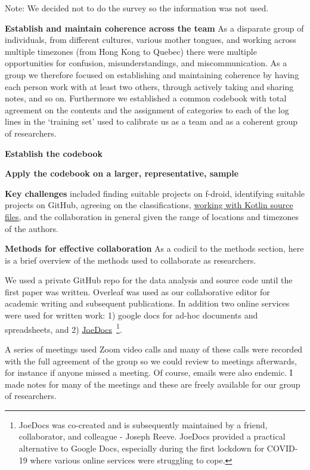Note: We decided not to do the survey so the information was not used.


\textbf{Establish and maintain coherence across the team}
As a disparate group of individuals, from different cultures, various mother tongues, and working across multiple timezones (from Hong Kong to Quebec) there were multiple opportunities for confusion, misunderstandings, and miscommunication. As a group we therefore focused on establishing and maintaining coherence by having each person work with at least two others, through actively taking and sharing notes, and so on. Furthermore we established a common codebook with total agreement on the contents and the assignment of categories to each of the log lines in the `training set' used to calibrate us as a team and as a coherent group of researchers.  

\textbf{Establish the codebook}


\textbf{Apply the codebook on a larger, representative, sample}


\textbf{Key challenges} included finding suitable projects on f-droid, identifying suitable projects on GitHub, agreeing on the classifications, \href{subsection_srcml_working_with_kotlin_files}{working with Kotlin source files}, and the collaboration in general given the range of locations and timezones of the authors. 

\textbf{Methods for effective collaboration}
As a codicil to the methods section, here is a brief overview of the methods used to collaborate as researchers. 

We used a private GitHub repo for the data analysis and source code until the first paper was written. Overleaf was used as our collaborative editor for academic writing and subsequent publications. In addition two online services were used for written work: 1) google docs for ad-hoc documents and spreadsheets, and 2) \href{https://joedocs.com/}{JoeDocs}~\footnote{JoeDocs was co-created and is subsequently maintained by a friend, collaborator, and colleague - Joseph Reeve. JoeDocs provided a practical alternative to Google Docs, especially during the first lockdown for COVID-19 where various online services were struggling to cope.}. 

A series of meetings used Zoom video calls and many of these calls were recorded with the full agreement of the group so we could review to meetings afterwards, for instance if anyone missed a meeting. Of course, emails were also endemic. I made notes for many of the meetings and these are freely available for our group of researchers.


